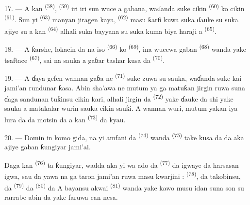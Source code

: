 17. --- A kan  \textsuperscript{(58)},
 \textsuperscript{(59)} iri iri sun wuce a gabana,
waɗanda suke cikin  \textsuperscript{(60)} ko cikin
 \textsuperscript{(61)}. Sun yi 
\textsuperscript{(63)} manyan jiragen kaya, 
\textsuperscript{(62)} masu ƙarfi kuwa suka ɗauke su suka ajiye su a kan
 \textsuperscript{(64)} alhali  suka bayyana su suka kuma biya haraji a 
\textsuperscript{(65)}.

18. --- A ƙarshe, lokacin da na iso 
\textsuperscript{(66)} ko  \textsuperscript{(69)}, ina
wucewa gaban  \textsuperscript{(68)} wanda yake
tsaftace  \textsuperscript{(67)}, sai na sauka a
gaɓar tashar kusa da 
\textsuperscript{(70)}.

19. --- A ɗaya gefen wannan gaɓa ne 
\textsuperscript{(71)} suke zuwa su sauka, waɗanda suke kai jami’an
rundunar ƙasa. Abin sha’awa ne mutum ya ga matuƙan jirgin ruwa suna
ɗaga sandunan tuƙinsu cikin kari, alhali jirgin da  \textsuperscript{(72)} yake ɗauke da shi yake sauka a matakalar
wurin sauka cikin sauƙi. A wannan wuri, mutum yakan iya lura da
 da motsin  da 
a kan  \textsuperscript{(73)} da kyau.

\VUsaut{3.0mm}
\VUsaut{3.0mm}

20. --- Domin in komo gida, na yi amfani da 
\textsuperscript{(74)} wanda  \textsuperscript{(75)} take
kusa da  da aka ajiye gaban ƙungiyar jami’ai.

Daga kan  \textsuperscript{(76)} ta ƙungiyar, wadda
aka yi wa ado da  \textsuperscript{(77)} da igwaye da
harsasan igwa, sau da yawa na ga taron jami’an ruwa masu kwarjini :
 \textsuperscript{(78)}, da takobinsu, da
 \textsuperscript{(79)} da  \textsuperscript{(80)} da  A
bayansu akwai  \textsuperscript{(81)} wanda
yake kawo musu  idan suna son su
rarrabe abin da yake faruwa can nesa.

